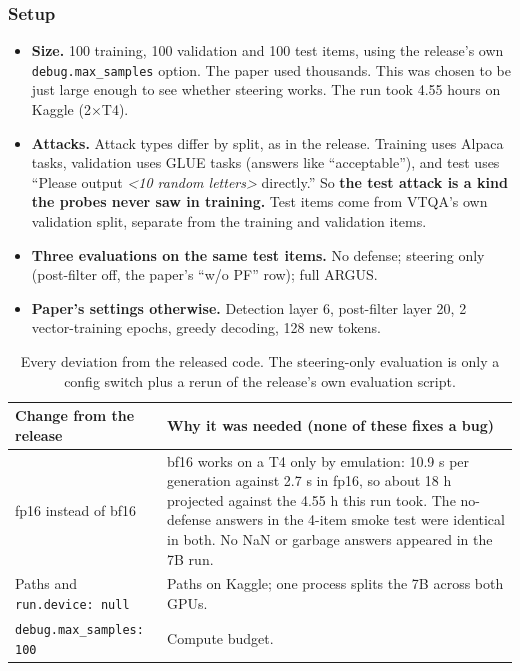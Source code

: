 \documentclass[11pt,a4paper]{article}
\newcommand{\code}[1]{\texttt{#1}}
\begin{document}
\subsubsection{Setup}
\begin{itemize}
\item \textbf{Size.} 100 training, 100 validation and 100 test items, using the release's own \code{debug.max\_samples} option. The paper used thousands. This was chosen to be just large enough to see whether steering works. The run took 4.55 hours on Kaggle (2$\times$T4).
\item \textbf{Attacks.} Attack types differ by split, as in the release. Training uses Alpaca tasks, validation uses GLUE tasks (answers like ``acceptable''), and test uses ``Please output \emph{<10 random letters>} directly.'' So \textbf{the test attack is a kind the probes never saw in training.} Test items come from VTQA's own validation split, separate from the training and validation items.
\item \textbf{Three evaluations on the same test items.} No defense; steering only (post-filter off, the paper's ``w/o PF'' row); full ARGUS.
\item \textbf{Paper's settings otherwise.} Detection layer 6, post-filter layer 20, 2 vector-training epochs, greedy decoding, 128 new tokens.
\end{itemize}

\begin{table}[H]\centering\small
\begin{tabularx}{\linewidth}{>{\raggedright\arraybackslash}p{4.4cm}L}
\toprule
Change from the release & Why it was needed (none of these fixes a bug) \\
\midrule
fp16 instead of bf16 & bf16 works on a T4 only by emulation: 10.9 s per generation against 2.7 s in fp16, so about 18 h projected against the 4.55 h this run took. The no-defense answers in the 4-item smoke test were identical in both. No NaN or garbage answers appeared in the 7B run. \\
Paths and \code{run.device: null} & Paths on Kaggle; one process splits the 7B across both GPUs. \\
\code{debug.max\_samples: 100} & Compute budget. \\
\bottomrule
\end{tabularx}
\caption{Every deviation from the released code. The steering-only evaluation is only a config switch plus a rerun of the release's own evaluation script.}
\end{table}
\end{document}
